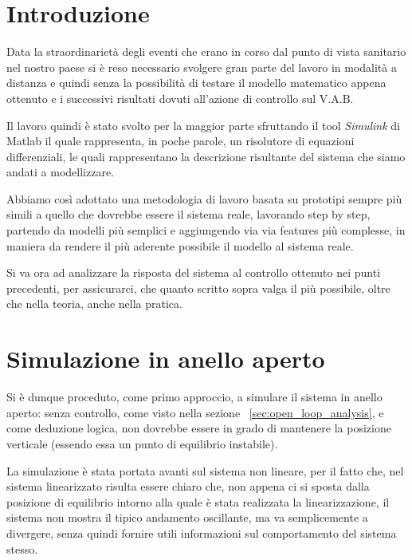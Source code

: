 \section{Introduzione}
Data la straordinarietà degli eventi che erano in corso dal punto di vista sanitario nel nostro paese si è reso necessario svolgere gran parte del lavoro in modalità a distanza e quindi senza la possibilità di testare il modello matematico appena ottenuto e i successivi risultati dovuti all'azione di controllo sul V.A.B.

Il lavoro quindi è stato svolto per la maggior parte sfruttando il tool \textit{Simulink} di Matlab il quale rappresenta, in poche parole, un risolutore di equazioni differenziali, le quali rappresentano la descrizione risultante del sistema che siamo andati a modellizzare.

Abbiamo così adottato una metodologia di lavoro basata su prototipi sempre più simili a quello che dovrebbe essere il sistema reale, lavorando step by step, partendo da modelli più semplici e aggiungendo via via features più complesse, in maniera da rendere il più aderente possibile il modello al sistema reale.

Si va ora ad analizzare la risposta del sistema al controllo ottenuto nei punti precedenti, per assicurarci, che quanto scritto sopra valga il più possibile, oltre che nella teoria, anche nella pratica.


\section{Simulazione in anello aperto}

Si è dunque proceduto, come primo approccio, a  simulare il sistema in anello aperto: senza controllo, come visto nella sezione ~\ref{sec:open_loop_analysis}, e come deduzione logica, non dovrebbe essere in grado di mantenere la posizione verticale (essendo essa un punto di equilibrio instabile).

La simulazione è stata portata avanti sul sistema non lineare, per il fatto che, nel sistema linearizzato risulta essere chiaro che, non appena ci si sposta dalla posizione di equilibrio intorno alla quale è stata realizzata la linearizzazione, il sistema non mostra il tipico andamento oscillante, ma va semplicemente a divergere, senza quindi fornire utili informazioni sul comportamento del sistema stesso.

